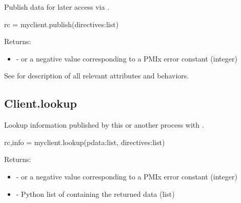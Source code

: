 Publish data for later access via .

\format

\pyspecificstart
\begin{codepar}
rc = myclient.publish(directives:list)
\end{codepar}
\pyspecificend

\begin{arglist}
\end{arglist}

Returns:

\begin{itemize}
    \item {} -  or a negative value corresponding to a PMIx error constant (integer)
\end{itemize}

See  for description of all relevant attributes and behaviors.


\subsection{Client.lookup}

\summary

Lookup information published by this or another process with .

\format

\pyspecificstart
\begin{codepar}
rc,info = myclient.lookup(pdata:list, directives:list)
\end{codepar}
\pyspecificend

\begin{arglist}
\end{arglist}

Returns:

\begin{itemize}
    \item {} -  or a negative value corresponding to a PMIx error constant (integer)
    \item {} - Python list of  containing the returned data (list)
\end{itemize}

